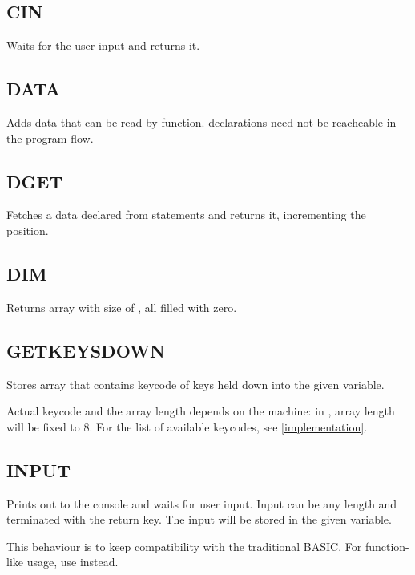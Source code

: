     \subsection{CIN}
        \par
        Waits for the user input and returns it.
    \subsection{DATA}
        \par
        Adds data that can be read by  function.  declarations need not be reacheable in the program flow.
    \subsection{DGET}
        \par
        Fetches a data declared from  statements and returns it, incrementing the  position.
    \subsection{DIM}
        \par
        Returns array with size of , all filled with zero.
    \subsection{GETKEYSDOWN}
        \par
        Stores array that contains keycode of keys held down into the given variable.\par
        Actual keycode and the array length depends on the machine: in \thismachine , array length will be fixed to 8. For the list of available keycodes, see \ref{implementation}.
    \subsection{INPUT}
        \par
        Prints out  to the console and waits for user input. Input can be any length and terminated with the return key. The input will be stored in the given variable.\par
        This behaviour is to keep compatibility with the traditional BASIC. For function-like usage, use  instead.
